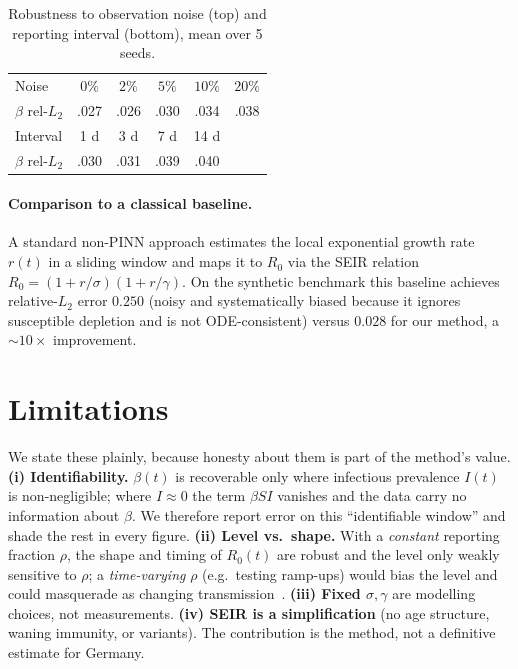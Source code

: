 \documentclass[10pt,twocolumn]{article}
\begin{document}
\begin{table}[t]
\centering
\small
\begin{tabular}{@{}lccccc@{}}
\toprule
Noise & $0\%$ & $2\%$ & $5\%$ & $10\%$ & $20\%$\\
$\beta$ rel-$L_2$ & .027 & .026 & .030 & .034 & .038\\
\midrule
Interval & 1 d & 3 d & 7 d & 14 d & \\
$\beta$ rel-$L_2$ & .030 & .031 & .039 & .040 & \\
\bottomrule
\end{tabular}
\caption{Robustness to observation noise (top) and reporting interval (bottom),
mean over 5 seeds.}
\label{tab:robust}
\end{table}

\paragraph{Comparison to a classical baseline.}
A standard non-PINN approach estimates the local exponential growth rate $r(t)$ in
a sliding window and maps it to $R_0$ via the SEIR relation
$R_0=(1+r/\sigma)(1+r/\gamma)$. On the synthetic benchmark this baseline achieves
relative-$L_2$ error $0.250$ (noisy and systematically biased because it ignores
susceptible depletion and is not ODE-consistent) versus $0.028$ for our method, a
$\sim\!10\times$ improvement.

\section{Limitations}
We state these plainly, because honesty about them is part of the method's value.
\textbf{(i) Identifiability.} $\beta(t)$ is recoverable only where infectious
prevalence $I(t)$ is non-negligible; where $I\!\approx\!0$ the term $\beta S I$
vanishes and the data carry no information about $\beta$. We therefore report error
on this ``identifiable window'' and shade the rest in every figure.
\textbf{(ii) Level vs.\ shape.} With a \emph{constant} reporting fraction $\rho$,
the shape and timing of $R_0(t)$ are robust and the level only weakly sensitive to
$\rho$; a \emph{time-varying} $\rho$ (e.g.\ testing ramp-ups) would bias the level
and could masquerade as changing transmission~\cite{gostic2020}.
\textbf{(iii) Fixed $\sigma,\gamma$} are modelling choices, not measurements.
\textbf{(iv) SEIR is a simplification} (no age structure, waning immunity, or
variants). The contribution is the method, not a definitive estimate for Germany.
\end{document}
